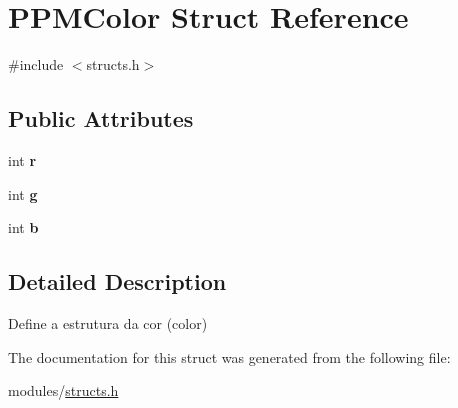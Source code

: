 \hypertarget{structPPMColor}{}\section{P\+P\+M\+Color Struct Reference}
\label{structPPMColor}


{\ttfamily \#include $<$structs.\+h$>$}

\subsection*{Public Attributes}
\begin{DoxyCompactItemize}
\item 
\mbox{\label{structPPMColor_a1e0644032bf9a7988844dae866ea8ad3}} 
int {\bfseries r}
\item 
\mbox{\label{structPPMColor_a2e51fa6d57d7cb24a38df8549081b760}} 
int {\bfseries g}
\item 
\mbox{\label{structPPMColor_a47c89e635609c5ed14c2a868d863a92e}} 
int {\bfseries b}
\end{DoxyCompactItemize}


\subsection{Detailed Description}
Define a estrutura da cor (color) 

The documentation for this struct was generated from the following file\+:\begin{DoxyCompactItemize}
\item 
modules/\hyperlink{structs_8h}{structs.\+h}\end{DoxyCompactItemize}
